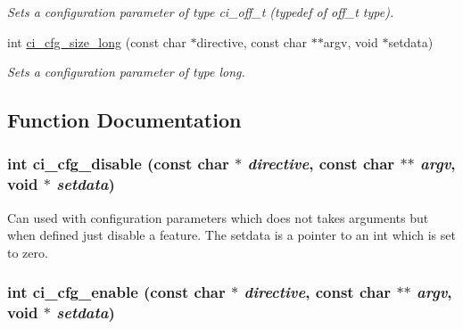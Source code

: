 \begin{DoxyCompactItemize}
\begin{DoxyCompactList}\small\item\em Sets a configuration parameter of type ci\_\-off\_\-t (typedef of off\_\-t type). \item\end{DoxyCompactList}\item 
\hypertarget{group__CONFIG_gafd9f19e3f063a11e643479e191fe7321}{
int \hyperlink{group__CONFIG_gafd9f19e3f063a11e643479e191fe7321}{ci\_\-cfg\_\-size\_\-long} (const char $\ast$directive, const char $\ast$$\ast$argv, void $\ast$setdata)}
\label{group__CONFIG_gafd9f19e3f063a11e643479e191fe7321}

\begin{DoxyCompactList}\small\item\em Sets a configuration parameter of type long. \item\end{DoxyCompactList}\end{DoxyCompactItemize}


\subsection{Function Documentation}
\hypertarget{group__CONFIG_ga110890915e5fc860a97cb89d6eb0b6bd}{
\subsubsection[{ci\_\-cfg\_\-disable}]{\setlength{\rightskip}{0pt plus 5cm}int ci\_\-cfg\_\-disable (const char $\ast$ {\em directive}, \/  const char $\ast$$\ast$ {\em argv}, \/  void $\ast$ {\em setdata})}}
\label{group__CONFIG_ga110890915e5fc860a97cb89d6eb0b6bd}


Can used with configuration parameters which does not takes arguments but when defined just disable a feature. The setdata is a pointer to an int which is set to zero. \hypertarget{group__CONFIG_ga6353b524c48945e300d4dca23aff9b8a}{
\subsubsection[{ci\_\-cfg\_\-enable}]{\setlength{\rightskip}{0pt plus 5cm}int ci\_\-cfg\_\-enable (const char $\ast$ {\em directive}, \/  const char $\ast$$\ast$ {\em argv}, \/  void $\ast$ {\em setdata})}}
\label{group__CONFIG_ga6353b524c48945e300d4dca23aff9b8a}


